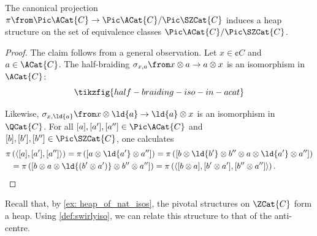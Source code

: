 \begin{lemma}\label{lem: quotient_of_Pic_A_is_heap}
  The canonical projection \(\pi \from \Pic \ACat{C} \to \Pic\ACat{C} / \Pic\SZCat{C}\) induces a heap structure on the set of equivalence classes \(\Pic\ACat{C} / \Pic\SZCat{C}\).
\end{lemma}
\begin{proof}
  The claim follows from a general observation.
  Let \(x \in \cent{C}\) and \(a \in \ACat{C}\).
  The half-braiding \(\sigma_{x,a} \from x \otimes a \to a \otimes x\) is an isomorphism in \(\ACat{C}\):
  \[
    \tikzfig{half-braiding-iso-in-acat}
  \]

  Likewise, \(\sigma_{x, \ld{a}} \from x \otimes \ld{a} \to \ld{a} \otimes x\) is an isomorphism in \(\QCat{C}\).
  For all \([a], [a'], [a''] \in \Pic \ACat{C}\)
  and \([b], [b'], [b''] \in\Pic \SZCat{C}\),
  one calculates
  \begin{align*}
    \pi & \left(\left\langle [a], [a'], [a''] \right\rangle \right)
        = \pi \left( [a \otimes\ld{a'}\otimes a''] \right)
        = \pi \left( [b \otimes \ld{b'} \otimes b'' \otimes a \otimes\ld{a'}\otimes a''] \right)\\
      & = \pi \left( [b \otimes a \otimes \ld{(b' \otimes a')} \otimes b'' \otimes a''] \right)
        = \pi \left(\left\langle [b \otimes a], [b' \otimes a'], [b'' \otimes a''] \right\rangle \right).
        \qedhere
  \end{align*}
\end{proof}

Recall that,
by \cref{ex: heap_of_nat_isos},
the pivotal structures on \(\ZCat{C}\) form a heap.
Using \cref{def:swirlyiso}, we can relate this structure to that of the anti-centre.

